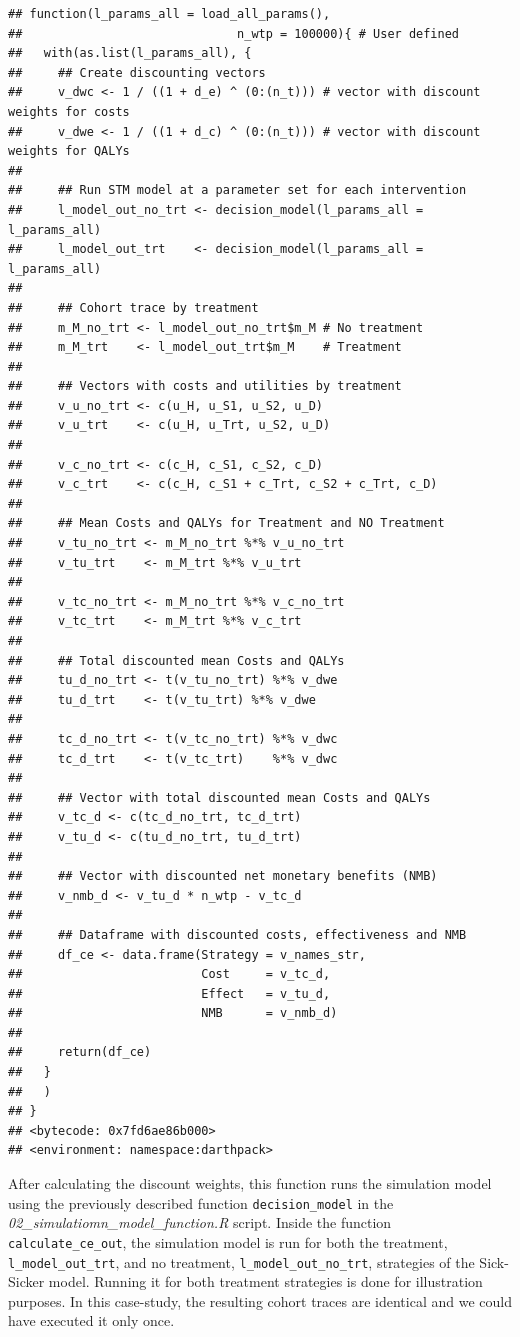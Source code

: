 \documentclass[]{book}
\begin{document}
\begin{verbatim}
## function(l_params_all = load_all_params(), 
##                              n_wtp = 100000){ # User defined
##   with(as.list(l_params_all), {
##     ## Create discounting vectors
##     v_dwc <- 1 / ((1 + d_e) ^ (0:(n_t))) # vector with discount weights for costs
##     v_dwe <- 1 / ((1 + d_c) ^ (0:(n_t))) # vector with discount weights for QALYs
##     
##     ## Run STM model at a parameter set for each intervention
##     l_model_out_no_trt <- decision_model(l_params_all = l_params_all)
##     l_model_out_trt    <- decision_model(l_params_all = l_params_all)
##     
##     ## Cohort trace by treatment
##     m_M_no_trt <- l_model_out_no_trt$m_M # No treatment
##     m_M_trt    <- l_model_out_trt$m_M    # Treatment
##     
##     ## Vectors with costs and utilities by treatment
##     v_u_no_trt <- c(u_H, u_S1, u_S2, u_D)
##     v_u_trt    <- c(u_H, u_Trt, u_S2, u_D)
##     
##     v_c_no_trt <- c(c_H, c_S1, c_S2, c_D)
##     v_c_trt    <- c(c_H, c_S1 + c_Trt, c_S2 + c_Trt, c_D)
##     
##     ## Mean Costs and QALYs for Treatment and NO Treatment
##     v_tu_no_trt <- m_M_no_trt %*% v_u_no_trt
##     v_tu_trt    <- m_M_trt %*% v_u_trt
##     
##     v_tc_no_trt <- m_M_no_trt %*% v_c_no_trt
##     v_tc_trt    <- m_M_trt %*% v_c_trt
##     
##     ## Total discounted mean Costs and QALYs
##     tu_d_no_trt <- t(v_tu_no_trt) %*% v_dwe 
##     tu_d_trt    <- t(v_tu_trt) %*% v_dwe
##     
##     tc_d_no_trt <- t(v_tc_no_trt) %*% v_dwc
##     tc_d_trt    <- t(v_tc_trt)    %*% v_dwc
##     
##     ## Vector with total discounted mean Costs and QALYs
##     v_tc_d <- c(tc_d_no_trt, tc_d_trt)
##     v_tu_d <- c(tu_d_no_trt, tu_d_trt)
##     
##     ## Vector with discounted net monetary benefits (NMB)
##     v_nmb_d <- v_tu_d * n_wtp - v_tc_d
##     
##     ## Dataframe with discounted costs, effectiveness and NMB
##     df_ce <- data.frame(Strategy = v_names_str,
##                         Cost     = v_tc_d,
##                         Effect   = v_tu_d,
##                         NMB      = v_nmb_d)
##     
##     return(df_ce)
##   }
##   )
## }
## <bytecode: 0x7fd6ae86b000>
## <environment: namespace:darthpack>
\end{verbatim}

After calculating the discount weights, this function runs the
simulation model using the previously described function
\texttt{decision\_model} in the
\emph{02\_simulatiomn\_model\_function.R} script. Inside the function
\texttt{calculate\_ce\_out}, the simulation model is run for both the
treatment, \texttt{l\_model\_out\_trt}, and no treatment,
\texttt{l\_model\_out\_no\_trt}, strategies of the Sick-Sicker model.
Running it for both treatment strategies is done for illustration
purposes. In this case-study, the resulting cohort traces are identical
and we could have executed it only once.
\end{document}

